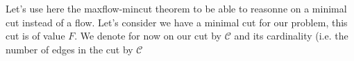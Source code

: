 Let's use here the maxflow-mincut theorem to be able to reasonne on a minimal cut instead of a flow. Let's consider we have a minimal cut for our problem, this cut is of value $F$. We denote for now on our cut by $\mathcal{C}$ and its cardinality (i.e. the number of edges in the cut by $\mathcal{C}$
